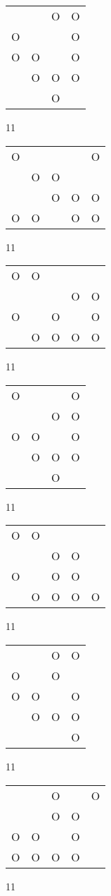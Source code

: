 \begin{tabular}{|m{0.2cm}m{0.2cm}m{0.2cm}m{0.2cm}|}\hline
 & &O&O\\
O& & &O\\
O&O& &O\\
 &O&O&O\\
 & &O& \\
\hline\end{tabular}11
\begin{tabular}{|m{0.2cm}m{0.2cm}m{0.2cm}m{0.2cm}m{0.2cm}|}\hline
O& & & &O\\
 &O&O& & \\
 & &O&O&O\\
O&O& &O&O\\
\hline\end{tabular}11
\begin{tabular}{|m{0.2cm}m{0.2cm}m{0.2cm}m{0.2cm}m{0.2cm}|}\hline
O&O& & & \\
 & & &O&O\\
O& &O& &O\\
 &O&O&O&O\\
\hline\end{tabular}11
\begin{tabular}{|m{0.2cm}m{0.2cm}m{0.2cm}m{0.2cm}|}\hline
O& & &O\\
 & &O&O\\
O&O& &O\\
 &O&O&O\\
 & &O& \\
\hline\end{tabular}11
\begin{tabular}{|m{0.2cm}m{0.2cm}m{0.2cm}m{0.2cm}m{0.2cm}|}\hline
O&O& & & \\
 & &O&O& \\
O& &O&O& \\
 &O&O&O&O\\
\hline\end{tabular}11
\begin{tabular}{|m{0.2cm}m{0.2cm}m{0.2cm}m{0.2cm}|}\hline
 & &O&O\\
O& &O& \\
O&O& &O\\
 &O&O&O\\
 & & &O\\
\hline\end{tabular}11
\begin{tabular}{|m{0.2cm}m{0.2cm}m{0.2cm}m{0.2cm}m{0.2cm}|}\hline
 & &O& &O\\
 & &O&O& \\
O&O& &O& \\
O&O&O&O& \\
\hline\end{tabular}11
